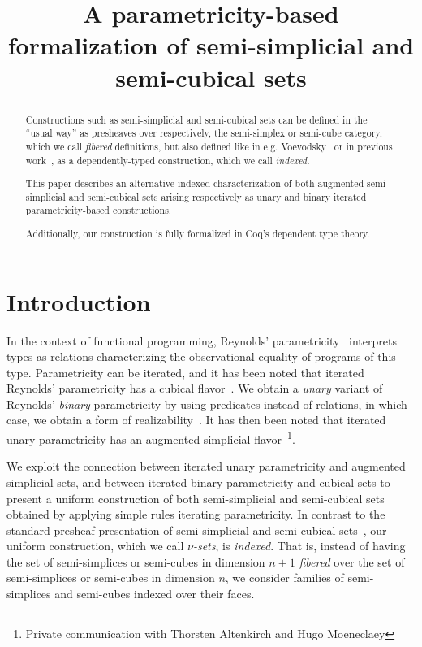 \documentclass[10pt]{art.cls/art}
\title{A parametricity-based formalization of semi-simplicial and semi-cubical sets}
\author{\IEEEauthorblockN{Hugo Herbelin \\ and Ramkumar Ramachandra} \IEEEauthorblockA{Université Paris Cité, Inria, CNRS, IRIF, Paris}}
\begin{document}
\maketitle
\begin{abstract}
  Constructions such as semi-simplicial and semi-cubical sets can be defined in the ``usual way'' as presheaves over respectively, the semi-simplex or semi-cube category, which we call \emph{fibered} definitions, but also defined like in e.g. Voevodsky~\cite{voevodsky12} or in previous work~\cite{herbelin15}, as a dependently-typed construction, which we call \emph{indexed}.

  This paper describes an alternative indexed characterization of both augmented semi-simplicial and semi-cubical sets arising respectively as unary and binary iterated parametricity-based constructions.

  Additionally, our construction is fully formalized in Coq's dependent type theory.
\end{abstract}

\section{Introduction}
In the context of functional programming, Reynolds' parametricity~\cite{reynolds72} interprets types as relations characterizing the observational equality of programs of this type. Parametricity can be iterated, and it has been noted that iterated Reynolds' parametricity has a cubical flavor~\cite{johann17,altenkirch15,moulin16,moeneclaey21,moeneclaey22phd}. We obtain a \emph{unary} variant of Reynolds' \emph{binary} parametricity by using predicates instead of relations, in which case, we obtain a form of realizability~\cite{bernardy12,moulin16}. It has then been noted that iterated unary parametricity has an augmented simplicial flavor~\footnote{Private communication with Thorsten Altenkirch and Hugo Moeneclaey}.

We exploit the connection between iterated unary parametricity and augmented simplicial sets, and between iterated binary parametricity and cubical sets to present a uniform construction of both semi-simplicial and semi-cubical sets obtained by applying simple rules iterating parametricity. In contrast to the standard presheaf presentation of semi-simplicial and semi-cubical sets~\cite{fri08,grandis03,buchholtz17}, our uniform construction, which we call \emph{$\nu$-sets}, is \emph{indexed}. That is, instead of having the set of semi-simplices or semi-cubes in dimension $n+1$ \emph{fibered} over the set of semi-simplices or semi-cubes in dimension $n$, we consider families of semi-simplices and semi-cubes indexed over their faces.
\end{document}
